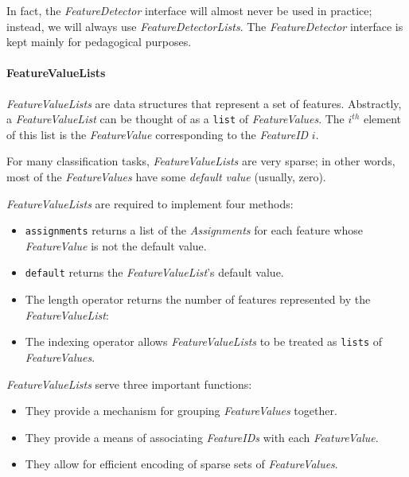 \documentclass[12pt]{article}
\begin{document}
      In fact, the \textit{FeatureDetector} interface will almost
      never be used in practice; instead, we will always use
      \textit{FeatureDetectorLists}.  The \textit{FeatureDetector}
      interface is kept mainly for pedagogical purposes.

      \paragraph{FeatureValueLists}

      \textit{FeatureValueLists} are data structures that represent a
      set of features.  Abstractly, a \textit{FeatureValueList} can be
      thought of as a \texttt{list} of \textit{FeatureValues}.  The
      $i^{th}$ element of this list is the \textit{FeatureValue}
      corresponding to the \textit{FeatureID} $i$.

      For many classification tasks, \textit{FeatureValueLists} are
      very sparse; in other words, most of the \textit{FeatureValues}
      have some \emph{default value} (usually, zero).

      \textit{FeatureValueLists} are required to implement four
      methods:

      \begin{itemize}

        \item \texttt{assignments} returns a list of the
        \textit{Assignments} for each feature whose
        \textit{FeatureValue} is not the default value.  

        \item \texttt{default} returns the \textit{FeatureValueList}'s
        default value.

        \item The length operator returns the number of features
        represented by the \textit{FeatureValueList}:

        \item The indexing operator allows
        \textit{FeatureValueLists} to be treated as \texttt{lists}
        of \textit{FeatureValues}.

      \end{itemize}

      \noindent
      \textit{FeatureValueLists} serve three important functions:

      \begin{itemize}

        \item They provide a mechanism for grouping
        \textit{FeatureValues} together.

        \item They provide a means of associating \textit{FeatureIDs}
        with each \textit{FeatureValue}.

        \item They allow for efficient encoding of sparse sets of
        \textit{FeatureValues}.

      \end{itemize}
\end{document}

